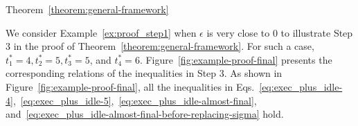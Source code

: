 \begin{appProof}{Theorem~\ref{theorem:general-framework}}
\begin{example}
  We consider Example~\ref{ex:proof_step1} when $\epsilon$ is very
  close to $0$ to illustrate Step 3 in the proof of
  Theorem~\ref{theorem:general-framework}. For such a case, $t_1^*=4,
  t_2^*=5, t_3^*=5$, and $t_4^*=6$.
  Figure~\ref{fig:example-proof-final} presents the corresponding
  relations of the inequalities in Step 3. 
As shown in Figure~\ref{fig:example-proof-final}, all the inequalities 
  in Eqs.~\eqref{eq:exec_plus_idle-4},~\eqref{eq:exec_plus_idle-5},~\eqref{eq:exec_plus_idle-almost-final}, and~\eqref{eq:exec_plus_idle-almost-final-before-replacing-sigma} hold.
\end{example}
\vspace{-0.3in}
\end{appProof}


